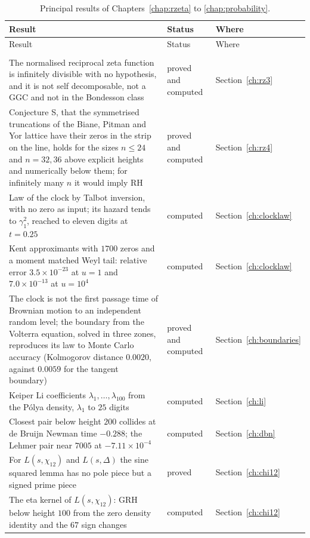 {\footnotesize
\begin{longtable}{p{}p{}p{}}
\toprule
Result & Status & Where\\
\midrule
\endfirsthead
\toprule
Result & Status & Where\\
\midrule
\endhead
\bottomrule
\endfoot
\bottomrule
\caption{Principal results of Chapters~\ref{chap:rzeta} to \ref{chap:probability}.}\label{tab:intro:summary45}\\
\endlastfoot
The normalised reciprocal zeta function is infinitely divisible with no hypothesis, and it is not self decomposable, not a GGC and not in the Bondesson class & \raggedright proved and computed & Section~\ref{ch:rz3}\\
Conjecture S, that the symmetrised truncations of the Biane, Pitman and Yor lattice have their zeros in the strip on the line, holds for the sizes $n\le24$ and $n=32,36$ above explicit heights and numerically below them; for infinitely many $n$ it would imply RH & \raggedright proved and computed & Section~\ref{ch:rz4}\\
Law of the clock by Talbot inversion, with no zero as input; its hazard tends to $\gamma_1^2$, reached to eleven digits at $t=0.25$ & \raggedright computed & Section~\ref{ch:clocklaw}\\
Kent approximants with $1700$ zeros and a moment matched Weyl tail: relative error $3.5\times10^{-23}$ at $u=1$ and $7.0\times10^{-13}$ at $u=10^4$ & \raggedright computed & Section~\ref{ch:clocklaw}\\
The clock is not the first passage time of Brownian motion to an independent random level; the boundary from the Volterra equation, solved in three zones, reproduces its law to Monte Carlo accuracy (Kolmogorov distance $0.0020$, against $0.0059$ for the tangent boundary) & \raggedright proved and computed & Section~\ref{ch:boundaries}\\
Keiper Li coefficients $\lambda_1,\dots,\lambda_{100}$ from the P\'olya density, $\lambda_1$ to $25$ digits & \raggedright computed & Section~\ref{ch:li}\\
Closest pair below height $200$ collides at de Bruijn Newman time $-0.288$; the Lehmer pair near $7005$ at $-7.11\times10^{-4}$ & \raggedright computed & Section~\ref{ch:dbn}\\
For $L(s,\chi_{12})$ and $L(s,\Delta)$ the sine squared lemma has no pole piece but a signed prime piece & \raggedright proved & Section~\ref{ch:chi12}\\
The eta kernel of $L(s,\chi_{12})$: GRH below height $100$ from the zero density identity and the $67$ sign changes & \raggedright computed & Section~\ref{ch:chi12}\\

\end{longtable}}
